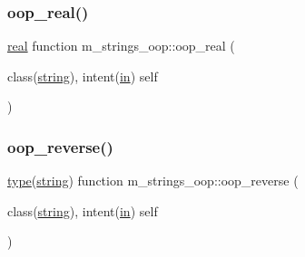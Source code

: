 \mbox{\label{namespacem__strings__oop_a9709a714bc825704651b00c7384a7547}} 
\subsubsection{\texorpdfstring{oop\+\_\+real()}{oop\_real()}}
{\footnotesize\ttfamily \hyperlink{read__watch_83_8txt_abdb62bde002f38ef75f810d3a905a823}{real} function m\+\_\+strings\+\_\+oop\+::oop\+\_\+real (\begin{DoxyParamCaption}\item[{class(\hyperlink{structm__strings__oop_1_1string}{string}), intent(\hyperlink{M__journal_83_8txt_afce72651d1eed785a2132bee863b2f38}{in})}]{self }\end{DoxyParamCaption})\hspace{0.3cm}{\ttfamily [private]}}

\mbox{\label{namespacem__strings__oop_ac3ab62e14d0b8445f51e084b810e2f76}} 
\subsubsection{\texorpdfstring{oop\+\_\+reverse()}{oop\_reverse()}}
{\footnotesize\ttfamily \hyperlink{stop__watch_83_8txt_a70f0ead91c32e25323c03265aa302c1c}{type}(\hyperlink{structm__strings__oop_1_1string}{string}) function m\+\_\+strings\+\_\+oop\+::oop\+\_\+reverse (\begin{DoxyParamCaption}\item[{class(\hyperlink{structm__strings__oop_1_1string}{string}), intent(\hyperlink{M__journal_83_8txt_afce72651d1eed785a2132bee863b2f38}{in})}]{self }\end{DoxyParamCaption})\hspace{0.3cm}{\ttfamily [private]}}

\mbox{\label{namespacem__strings__oop_af653c84bbd0165d1d4a3b61efe0472e8}} 
